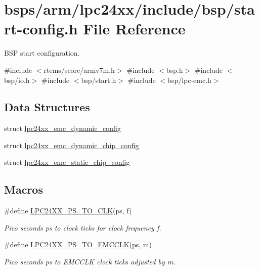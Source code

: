 \hypertarget{start-config_8h}{}\section{bsps/arm/lpc24xx/include/bsp/start-\/config.h File Reference}
\label{start-config_8h}


B\+SP start configuration.  


{\ttfamily \#include $<$rtems/score/armv7m.\+h$>$}\newline
{\ttfamily \#include $<$bsp.\+h$>$}\newline
{\ttfamily \#include $<$bsp/io.\+h$>$}\newline
{\ttfamily \#include $<$bsp/start.\+h$>$}\newline
{\ttfamily \#include $<$bsp/lpc-\/emc.\+h$>$}\newline
\subsection*{Data Structures}
\begin{DoxyCompactItemize}
\item 
struct \mbox{\hyperlink{structlpc24xx__emc__dynamic__config}{lpc24xx\+\_\+emc\+\_\+dynamic\+\_\+config}}
\item 
struct \mbox{\hyperlink{structlpc24xx__emc__dynamic__chip__config}{lpc24xx\+\_\+emc\+\_\+dynamic\+\_\+chip\+\_\+config}}
\item 
struct \mbox{\hyperlink{structlpc24xx__emc__static__chip__config}{lpc24xx\+\_\+emc\+\_\+static\+\_\+chip\+\_\+config}}
\end{DoxyCompactItemize}
\subsection*{Macros}
\begin{DoxyCompactItemize}
\item 
\#define \mbox{\hyperlink{start-config_8h_aedc00c1ff0006cb3bc5b6a30f2feb507}{L\+P\+C24\+X\+X\+\_\+\+P\+S\+\_\+\+T\+O\+\_\+\+C\+LK}}(ps,  f)
\begin{DoxyCompactList}\small\item\em Pico seconds {\itshape ps} to clock ticks for clock frequency {\itshape f}. \end{DoxyCompactList}\item 
\#define \mbox{\hyperlink{start-config_8h_a9173f09d88fd40c19a4d6fd99ba3a321}{L\+P\+C24\+X\+X\+\_\+\+P\+S\+\_\+\+T\+O\+\_\+\+E\+M\+C\+C\+LK}}(ps,  m)
\begin{DoxyCompactList}\small\item\em Pico seconds {\itshape ps} to E\+M\+C\+C\+LK clock ticks adjusted by {\itshape m}. \end{DoxyCompactList}\end{DoxyCompactItemize}
